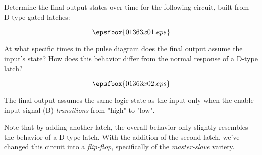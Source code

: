 

Determine the final output states over time for the following circuit, built from D-type gated latches:

$$\epsfbox{01363x01.eps}$$

At what specific times in the pulse diagram does the final output assume the input's state?  How does this behavior differ from the normal response of a D-type latch?







$$\epsfbox{01363x02.eps}$$

The final output assumes the same logic state as the input only when the enable input signal (B) {\it transitions} from "high" to "low".







Note that by adding another latch, the overall behavior only slightly resembles the behavior of a D-type latch.  With the addition of the second latch, we've changed this circuit into a {\it flip-flop}, specifically of the {\it master-slave} variety.




